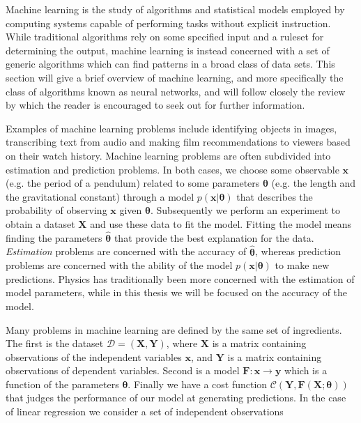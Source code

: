 Machine learning is the study of algorithms and statistical models employed by computing systems
capable of performing tasks without explicit instruction. While traditional algorithms
rely on some specified input and a ruleset for determining the output, machine learning
is instead concerned with a set of generic algorithms which can find patterns
in a broad class of data sets. This section will give a brief overview of machine learning,
and more specifically the class of algorithms known as neural networks, and will follow closely the review by
\parencite[Mehta et al.][pages 1-64]{mehta2019high}
which the reader is encouraged to seek out for further information.
\par
Examples of machine learning problems include identifying objects in images,
transcribing text from audio and making film recommendations to viewers based on their watch history.
Machine learning problems are often subdivided into estimation and prediction problems.
In both cases, we choose some observable $\bm{x}$ (e.g. the period of a pendulum)
related to some parameters $\bm{\theta}$ (e.g. the length and the gravitational constant)
through a model $p(\bm{x} \lvert \bm{\theta})$ that describes the probability of observing
$\bm{x}$ given $\bm{\theta}$. Subsequently we perform an experiment to obtain a dataset
$\bm{X}$ and use these data to fit the model. Fitting the model means finding
the parameters $\hat{\bm{\theta}}$ that provide the best explanation for the data. 
\textit{Estimation} problems are concerned with the accuracy of $\hat{\bm{\theta}}$, whereas
prediction problems are concerned with the ability of the model $p(\bm{x} \lvert \bm{\theta})$
to make new predictions.
Physics has traditionally been more concerned with the estimation of model parameters, while in
this thesis we will be focused on the accuracy of the model.
\par
Many problems in machine learning are defined by the same set of ingredients.
The first is the dataset $\mathcal{D} = (\bm{X}, \bm{Y})$, where $\bm{X}$ is a matrix
containing observations of the independent variables $\bm{x}$, and $\bm{Y}$ is a matrix containing
observations of dependent variables. Second is a model $\bm{F}: \bm{x} \rightarrow \bm{y}$
which is a function of the parameters $\bm{\theta}$. Finally we have a cost function
$\mathcal{C}\left(\bm{Y}, \bm{F}\left(\bm{X} ; \bm{\theta}\right)\right)$
that judges the performance of our model at generating predictions.
\newline
In the case of linear regression we consider a set of independent observations
